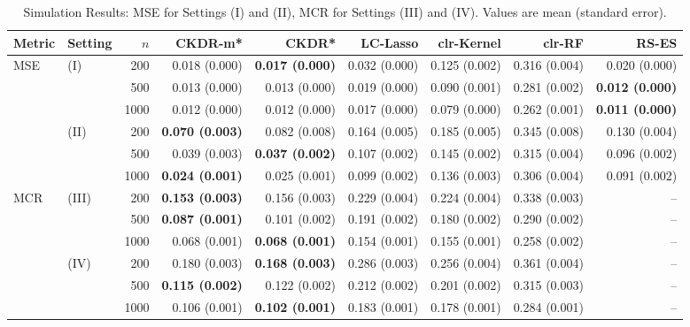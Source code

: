 \begin{table}[htbp]
\centering
\caption{Simulation Results: MSE for Settings (I) and (II), MCR for Settings (III) and (IV). Values are mean (standard error).}
\label{tab:simulation_results}
\begin{tabular}{llrrrrrrr}
\toprule
Metric & Setting & $n$ & CKDR-m* & CKDR* & LC-Lasso & clr-Kernel & clr-RF & RS-ES \\ 
\midrule
\multirow{6}{*}{MSE} & \multirow{3}{*}{(I)} & 200 & 0.018 (0.000) & \textbf{0.017 (0.000)} & 0.032 (0.000) & 0.125 (0.002) & 0.316 (0.004) & 0.020 (0.000) \\ 
 &  & 500 & 0.013 (0.000) & 0.013 (0.000) & 0.019 (0.000) & 0.090 (0.001) & 0.281 (0.002) & \textbf{0.012 (0.000)} \\ 
 &  & 1000 & 0.012 (0.000) & 0.012 (0.000) & 0.017 (0.000) & 0.079 (0.000) & 0.262 (0.001) & \textbf{0.011 (0.000)} \\ 
 & \multirow{3}{*}{(II)} & 200 & \textbf{0.070 (0.003)} & 0.082 (0.008) & 0.164 (0.005) & 0.185 (0.005) & 0.345 (0.008) & 0.130 (0.004) \\ 
 &  & 500 & 0.039 (0.003) & \textbf{0.037 (0.002)} & 0.107 (0.002) & 0.145 (0.002) & 0.315 (0.004) & 0.096 (0.002) \\ 
 &  & 1000 & \textbf{0.024 (0.001)} & 0.025 (0.001) & 0.099 (0.002) & 0.136 (0.003) & 0.306 (0.004) & 0.091 (0.002) \\ 
\midrule
\multirow{6}{*}{MCR} & \multirow{3}{*}{(III)} & 200 & \textbf{0.153 (0.003)} & 0.156 (0.003) & 0.229 (0.004) & 0.224 (0.004) & 0.338 (0.003) & -- \\ 
 &  & 500 & \textbf{0.087 (0.001)} & 0.101 (0.002) & 0.191 (0.002) & 0.180 (0.002) & 0.290 (0.002) & -- \\ 
 &  & 1000 & 0.068 (0.001) & \textbf{0.068 (0.001)} & 0.154 (0.001) & 0.155 (0.001) & 0.258 (0.002) & -- \\ 
 & \multirow{3}{*}{(IV)} & 200 & 0.180 (0.003) & \textbf{0.168 (0.003)} & 0.286 (0.003) & 0.256 (0.004) & 0.361 (0.004) & -- \\ 
 &  & 500 & \textbf{0.115 (0.002)} & 0.122 (0.002) & 0.212 (0.002) & 0.201 (0.002) & 0.315 (0.003) & -- \\ 
 &  & 1000 & 0.106 (0.001) & \textbf{0.102 (0.001)} & 0.183 (0.001) & 0.178 (0.001) & 0.284 (0.001) & -- \\ 
\bottomrule
\end{tabular}
\end{table}